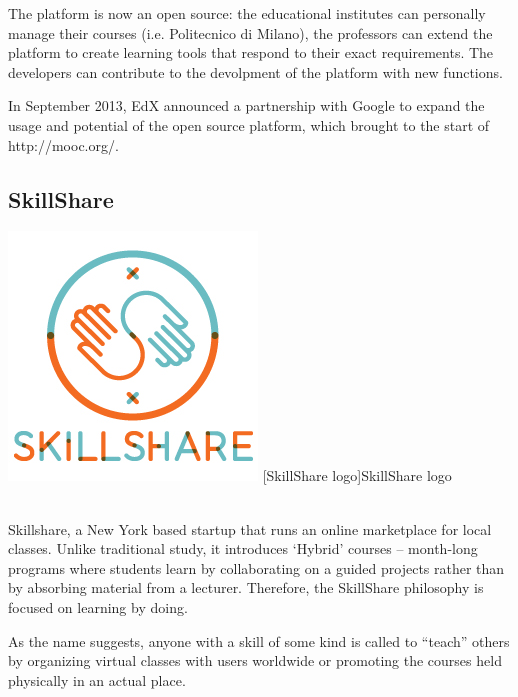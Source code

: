 The platform is now an open source: the educational institutes can personally manage their courses (i.e. Politecnico di Milano), the professors can extend the platform to create learning tools that respond to their exact requirements. The developers can contribute to the devolpment of the platform with new functions.

In September 2013, EdX announced a partnership with Google to expand the usage and potential of the open source platform, which brought to the start of http://mooc.org/.


\subsection{SkillShare}
\label{subsec:SkillShare}

\begin{minipage}{\linewidth}
      \centering
      \includegraphics[width=0.5\linewidth]{images/chapter1/skillshare.jpg}
      [SkillShare logo]{SkillShare logo}
  \end{minipage}
  \\




Skillshare, a New York based startup that runs an online marketplace for local classes.
Unlike traditional study, it introduces ‘Hybrid’ courses – month-long programs where students learn by collaborating on a guided projects rather than by absorbing material from a lecturer. Therefore, the SkillShare philosophy is focused on learning by doing.

As the name suggests, anyone with a skill of some kind is called to “teach” others by organizing virtual classes with users worldwide or promoting the courses held physically in an actual place.

